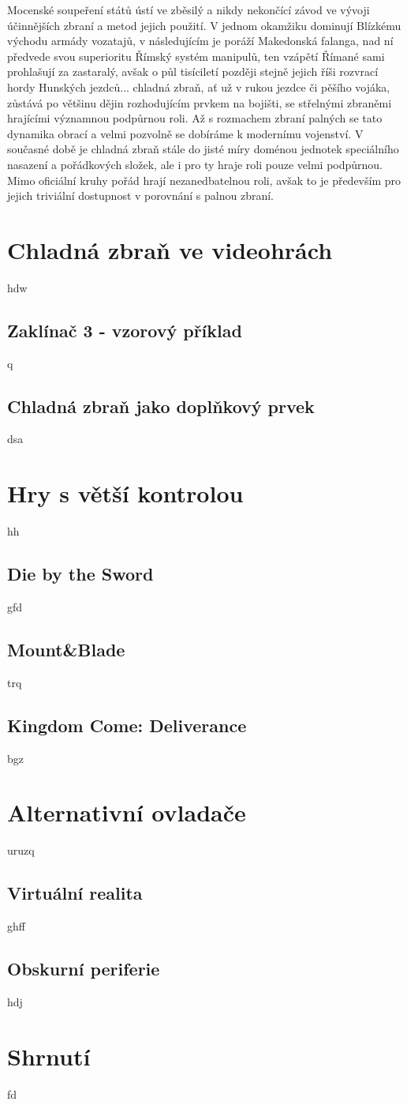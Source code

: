 Mocenské soupeření států ústí ve zběsilý a nikdy nekončící závod ve vývoji účinnějších zbraní a metod jejich použití. V jednom okamžiku dominují Blízkému východu armády vozatajů, v následujícím je poráží Makedonská falanga, nad ní předvede svou superioritu Římský systém manipulů, ten vzápětí Římané sami prohlašují za zastaralý, avšak o půl tisíciletí později stejně jejich říši rozvrací hordy Hunských jezdců... chladná zbraň, ať už v rukou jezdce či pěšího vojáka, zůstává po většinu dějin rozhodujícím prvkem na bojišti, se střelnými zbraněmi hrajícími významnou podpůrnou roli. Až s rozmachem zbraní palných se tato dynamika obrací a velmi pozvolně se dobíráme k modernímu vojenství. V současné době je chladná zbraň stále do jisté míry doménou jednotek speciálního nasazení a pořádkových složek, ale i pro ty hraje roli pouze velmi podpůrnou. Mimo oficiální kruhy pořád hrají nezanedbatelnou roli, avšak to je především pro jejich triviální dostupnost v porovnání s palnou zbraní.

\section{Chladná zbraň ve videohrách}
hdw

\subsection{Zaklínač 3 - vzorový příklad}
q

\subsection{Chladná zbraň jako doplňkový prvek}
dsa



\section{Hry s větší kontrolou}
hh

\subsection{Die by the Sword}
gfd

\subsection{Mount\&Blade}
trq

\subsection{Kingdom Come: Deliverance}
bgz


\section{Alternativní ovladače}
uruzq

\subsection{Virtuální realita}
ghff

\subsection{Obskurní periferie}
hdj


\section{Shrnutí}
fd
